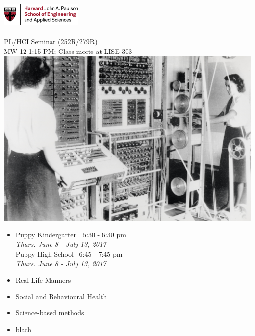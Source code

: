 \documentclass[14pt]{extarticle}
\begin{document}
\begin{center}
\includegraphics[width=0.3\textwidth]{H_SEAS_logo_RGB.jpg}
\\\\
\huge{PL/HCI Seminar (252R/279R)}\\
\large{MW 12-1:15 PM; Class meets at LISE 303}
\includegraphics[width=\textwidth]{Colossus.jpg}


\end{center}

\begin{multicols}{2}
\begin{itemize}
\item[]Puppy Kindergarten \textbar\ 5:30 - 6:30 pm\\
\emph{Thurs. June 8 - July 13, 2017}\\

Puppy High School \textbar\ 6:45 - 7:45 pm\\
\emph{Thurs. June 8 - July 13, 2017}\\


\end{itemize}
\columnbreak

\begin{itemize}
\item Real-Life Manners
\item Social and Behavioural Health
\item Science-based methods
\item blach
\end{itemize}

\end{multicols}
\end{document}
